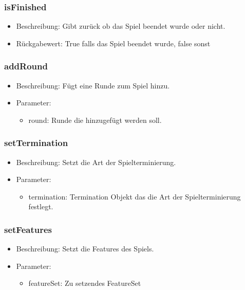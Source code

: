 \documentclass[a4paper]{scrreprt}
\begin{document}
    \subsubsection{isFinished}
    \begin{itemize}
        \item Beschreibung: Gibt zurück ob das Spiel beendet wurde oder nicht.
        \item Rückgabewert: True falls das Spiel beendet wurde, false sonst
    \end{itemize}

    \subsubsection{addRound}
    \begin{itemize}
        \item Beschreibung: Fügt eine Runde zum Spiel hinzu.
        \item Parameter:
        \begin{itemize}
            \item round: Runde die hinzugefügt werden soll.
        \end{itemize}
    \end{itemize}

    \subsubsection{setTermination}
    \begin{itemize}
        \item Beschreibung: Setzt die Art der Spielterminierung.
        \item Parameter:
        \begin{itemize}
            \item termination: Termination Objekt das die Art der Spielterminierung festlegt.
        \end{itemize}
    \end{itemize}

    \subsubsection{setFeatures}
    \begin{itemize}
        \item Beschreibung: Setzt die Features des Spiels.
        \item Parameter:
        \begin{itemize}
            \item featureSet: Zu setzendes FeatureSet
        \end{itemize}
    \end{itemize}
\end{document}
